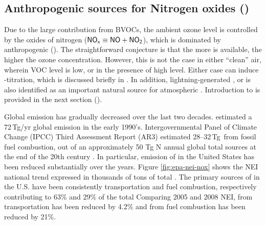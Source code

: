 \subsection{Anthropogenic sources for Nitrogen oxides (\anox)} \label{ssec:intro/ozone/nox}

	Due to the large contribution from BVOCs, the ambient ozone level is controlled by the oxides of nitrogen ($\chem{NO_x}\equiv\chem{NO}+\chem{NO_2}$), which is dominated by anthropogenic  (\anox). The straightforward conjecture is that the more  is available, the higher the ozone concentration. However, this is not the case in either ``clean'' air, wherein VOC level is low, or in the presence of high  level. Either case can induce -titration, which is discussed briefly in . In addition, lightning-generated , or {\lnox} is also identified as an important natural source for atmospheric . Introduction to {\lnox} is provided in the next section ().


	Global  emission has gradually decreased over the last two decades. \citet{Muller:1992kx} estimated a 72\,\unit{Tg/yr} global emission in the early 1990's.  Intergovernmental Panel of Climate Change (IPCC) Third Assessment Report (AR3) estimated 28--32\,\unit{Tg}\, from fossil fuel combustion, out of an approximately 50 Tg N annual global total  sources at the end of the 20th century \citep[][ and references therein]{Schumann:2007fk,Lamarque:2010fk}. In particular, emission of {\anox} in the United States has been reduced substantially over the years. Figure \ref{fig:epa-nei-nox} shows the NEI national trend expressed in thousands of tons of total . The primary sources of {\anox} in the U.S. have been consistently transportation and fuel combustion, respectively contributing to 63\% and 29\% of the total {\anox} Comparing 2005 and 2008 NEI,  from transportation has been reduced by 4.2\% and  from fuel combustion has been reduced by 21\%.

